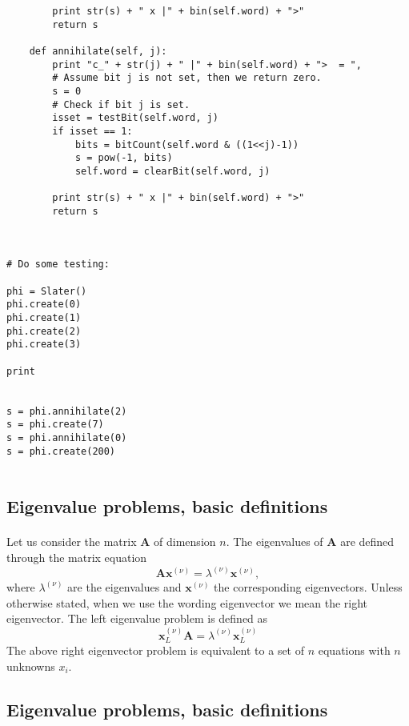 \documentclass[%
oneside,                 %
final,                   %
10pt]{article}
\begin{document}
\begin{verbatim}
        print str(s) + " x |" + bin(self.word) + ">"
        return s
        
    def annihilate(self, j):
        print "c_" + str(j) + " |" + bin(self.word) + ">  = ",
        # Assume bit j is not set, then we return zero.
        s = 0
        # Check if bit j is set.
        isset = testBit(self.word, j)
        if isset == 1:
            bits = bitCount(self.word & ((1<<j)-1))
            s = pow(-1, bits)
            self.word = clearBit(self.word, j)

        print str(s) + " x |" + bin(self.word) + ">"
        return s



# Do some testing:

phi = Slater()
phi.create(0)
phi.create(1)
phi.create(2)
phi.create(3)

print


s = phi.annihilate(2)
s = phi.create(7)
s = phi.annihilate(0)
s = phi.create(200)


\end{verbatim}

    

\subsection*{Eigenvalue problems, basic definitions}

\paragraph{}
Let us consider the matrix $\mathbf{A}$ of dimension $n$. The eigenvalues of
$\mathbf{A}$ are defined through the matrix equation 
\[
   \mathbf{A}\mathbf{x}^{(\nu)} = \lambda^{(\nu)}\mathbf{x}^{(\nu)},
\]
where $\lambda^{(\nu)}$ are the eigenvalues and $\mathbf{x}^{(\nu)}$ the
corresponding eigenvectors.
Unless otherwise stated, when we use the wording eigenvector we mean the
right eigenvector. The left eigenvalue problem is defined as 
\[
\mathbf{x}^{(\nu)}_L\mathbf{A} = \lambda^{(\nu)}\mathbf{x}^{(\nu)}_L
\]
The above right eigenvector problem is equivalent to a set of $n$ equations with $n$ unknowns
$x_i$.



\subsection*{Eigenvalue problems, basic definitions}
\end{document}
